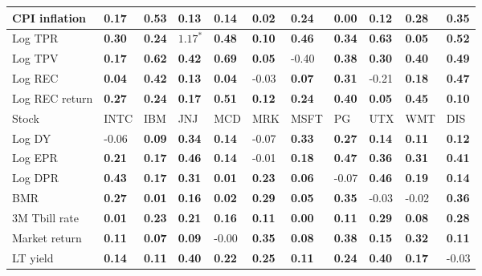 \begin{table}[h!]
{\begin{center}
\begin{tabularx}{1\textwidth}{@{}X@{\hspace{0.2cm}}l@{\hspace{0.2cm}}l@{\hspace{0.2cm}}l@{\hspace{0.2cm}}l@{\hspace{0.2cm}}l@{\hspace{0.2cm}}l@{\hspace{0.2cm}}l@{\hspace{0.2cm}}l@{\hspace{0.2cm}}l@{\hspace{0.2cm}}l@{}}
 CPI inflation  & \textbf{0.17}	 & \textbf{0.53}	 & \textbf{0.13}	 & \textbf{0.14}	 & \textbf{0.02}	 & \textbf{0.24}	 & \textbf{0.00}	 & \textbf{0.12}	 & \textbf{0.28}	 & \textbf{0.35}	\\
\midrule
 Log TPR  & \textbf{0.30}	 & \textbf{0.24}	 & $\mathbf{1.17^{*}}$	 & \textbf{0.48}	 & \textbf{0.10}	 & \textbf{0.46}	 & \textbf{0.34}	 & \textbf{0.63}	 & \textbf{0.05}	 & \textbf{0.52}	\\
 Log TPV  & \textbf{0.17}	 & \textbf{0.62}	 & \textbf{0.42}	 & \textbf{0.69}	 & \textbf{0.05}	 & -0.40	 & \textbf{0.38}	 & \textbf{0.30}	 & \textbf{0.40}	 & \textbf{0.49}	\\
 Log REC  & \textbf{0.04}	 & \textbf{0.42}	 & \textbf{0.13}	 & \textbf{0.04}	 & -0.03	 & \textbf{0.07}	 & \textbf{0.31}	 & -0.21	 & \textbf{0.18}	 & \textbf{0.47}	\\
 Log REC return  & \textbf{0.27}	 & \textbf{0.24}	 & \textbf{0.17}	 & \textbf{0.51}	 & \textbf{0.12}	 & \textbf{0.24}	 & \textbf{0.40}	 & \textbf{0.05}	 & \textbf{0.45}	 & \textbf{0.10}	\\
\midrule
\midrule
 Stock  & INTC	 & IBM	 & JNJ	 & MCD	 & MRK	 & MSFT	 & PG	 & UTX	 & WMT	 & DIS	\\
\midrule
 Log DY  & -0.06	 & \textbf{0.09}	 & \textbf{0.34}	 & \textbf{0.14}	 & -0.07	 & \textbf{0.33}	 & \textbf{0.27}	 & \textbf{0.14}	 & \textbf{0.11}	 & \textbf{0.12}	\\
 Log EPR  & \textbf{0.21}	 & \textbf{0.17}	 & \textbf{0.46}	 & \textbf{0.14}	 & -0.01	 & \textbf{0.18}	 & \textbf{0.47}	 & \textbf{0.36}	 & \textbf{0.31}	 & \textbf{0.41}	\\
 Log DPR  & \textbf{0.43}	 & \textbf{0.17}	 & \textbf{0.31}	 & \textbf{0.01}	 & \textbf{0.23}	 & \textbf{0.06}	 & -0.07	 & \textbf{0.46}	 & \textbf{0.19}	 & \textbf{0.14}	\\
 BMR  & \textbf{0.27}	 & \textbf{0.01}	 & \textbf{0.16}	 & \textbf{0.02}	 & \textbf{0.29}	 & \textbf{0.05}	 & \textbf{0.35}	 & -0.03	 & -0.02	 & \textbf{0.36}	\\
\midrule
 3M Tbill rate  & \textbf{0.01}	 & \textbf{0.23}	 & \textbf{0.21}	 & \textbf{0.16}	 & \textbf{0.11}	 & \textbf{0.00}	 & \textbf{0.11}	 & \textbf{0.29}	 & \textbf{0.08}	 & \textbf{0.28}	\\
 Market return  & \textbf{0.11}	 & \textbf{0.07}	 & \textbf{0.09}	 & -0.00	 & \textbf{0.35}	 & \textbf{0.08}	 & \textbf{0.38}	 & \textbf{0.15}	 & \textbf{0.32}	 & \textbf{0.11}	\\
 LT yield  & \textbf{0.14}	 & \textbf{0.11}	 & \textbf{0.40}	 & \textbf{0.22}	 & \textbf{0.25}	 & \textbf{0.11}	 & \textbf{0.24}	 & \textbf{0.40}	 & \textbf{0.17}	 & -0.03	\\

\end{tabularx}
\end{center}}
\end{table}
